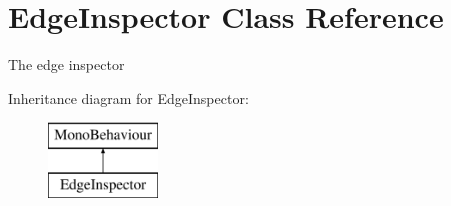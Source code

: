 \hypertarget{class_edge_inspector}{}\section{Edge\+Inspector Class Reference}
\label{class_edge_inspector}


The edge inspector  


Inheritance diagram for Edge\+Inspector\+:\begin{figure}[H]
\begin{center}
\leavevmode
\includegraphics[height=2.000000cm]{class_edge_inspector}
\end{center}
\end{figure}

